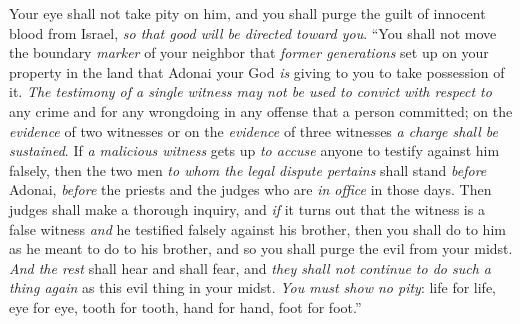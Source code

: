 \begin{biblechapter}
\verse Your eye shall not take pity on him, and you shall purge the guilt of innocent blood from Israel, \textit{so that good will be directed toward you}.
\verse “You shall not move the boundary \textit{marker} of your neighbor that \textit{former generations} set up on your property in the land that Adonai your God \textit{is} giving to you to take possession of it.
\verse \textit{The testimony of a single witness may not be used to convict} \textit{with respect to} any crime and for any wrongdoing in any offense that a person committed; on the \textit{evidence} of two witnesses or on the \textit{evidence} of three witnesses \textit{a charge shall be sustained}.
\verse If \textit{a malicious witness} gets up \textit{to accuse} anyone to testify against him falsely,
\verse then the two men \textit{to whom the legal dispute pertains} shall stand \textit{before} Adonai, \textit{before} the priests and the judges who are \textit{in office} in those days.
\verse Then judges shall make a thorough inquiry, and \textit{if} it turns out that the witness is a false witness \textit{and} he testified falsely against his brother,
\verse then you shall do to him as he meant to do to his brother, and so you shall purge the evil from your midst.
\verse \textit{And the rest} shall hear and shall fear, and \textit{they shall not continue to do such a thing again} as this evil thing in your midst.
\verse \textit{You must show no pity}: life for life, eye for eye, tooth for tooth, hand for hand, foot for foot.”
\end{biblechapter}

